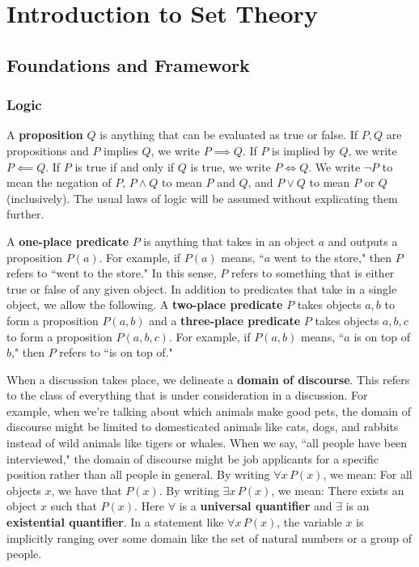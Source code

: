 \chapter{Introduction to Set Theory}\label{ch1_set_theory}

\section{Foundations and Framework}\label{ch1sec_foundations_and_framework}

\subsection{Logic}

A \textbf{proposition} $Q$ is anything that can be evaluated as true or false. 
If $P, Q$ are propositions and $P$ implies $Q$, we write $P\implies Q$. 
If $P$ is implied by $Q$, we write $P\impliedby Q$.
If $P$ is true if and only if $Q$ is true, we write $P\iff Q$. 
We write $\neg P$ to mean the negation of $P$, $P\land Q$ to mean $P$ and $Q$, and $P\lor Q$ to mean $P$ or $Q$ (inclusively).
The usual laws of logic will be assumed without explicating them further.

A \textbf{one-place predicate} $P$ is anything that takes in an object $a$ and outputs a proposition $P(a)$. 
For example, if $P(a)$ means, ``$a$ went to the store," then $P$ refers to ``went to the store."
In this sense, $P$ refers to something that is either true or false of any given object. 
In addition to predicates that take in a single object, we allow the following. 
A \textbf{two-place predicate} $P$ takes objects $a, b$ to form a proposition $P(a, b)$ and a \textbf{three-place predicate} $P$ takes objects $a, b, c$ to form a proposition $P(a, b, c)$.
For example, if $P(a, b)$ means, ``$a$ is on top of $b$," then $P$ refers to ``is on top of."

When a discussion takes place, we delineate a \textbf{domain of discourse}. 
This refers to the class of everything that is under consideration in a discussion.
For example, when we're talking about which animals make good pets, the domain of discourse might be limited to domesticated animals like cats, dogs, and rabbits instead of wild animals like tigers or whales.
When we say, ``all people have been interviewed," the domain of discourse might be job applicants for a specific position rather than all people in general. 
By writing $\forall x\, P(x)$, we mean: For all objects $x$, we have that $P(x)$.
By writing $\exists x\, P(x)$, we mean: There exists an object $x$ such that $P(x)$.
Here $\forall$ is a \textbf{universal quantifier} and $\exists$ is an \textbf{existential quantifier}. 
In a statement like $\forall x\, P(x)$, the variable $x$ is implicitly ranging over some domain like the set of natural numbers or a group of people.

